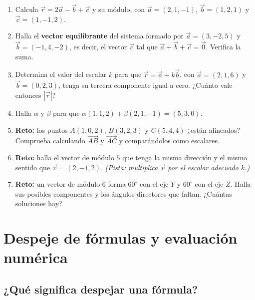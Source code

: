 \documentclass[12pt, letterpaper]{article}
\begin{document}
\begin{enumerate}[leftmargin=*, resume]
  \item \dificil{} Calcula $\vec{r} = 2\vec{a} - \vec{b} + \vec{c}$ y su módulo, con $\vec{a} = (2, 1, -1)$, $\vec{b} = (1, 2, 1)$ y $\vec{c} = (1, -1, 2)$.

  \item \dificil{} Halla el \textbf{vector equilibrante} del sistema formado por $\vec{a} = (3, -2, 5)$ y $\vec{b} = (-1, 4, -2)$, es decir, el vector $\vec{c}$ tal que $\vec{a} + \vec{b} + \vec{c} = \vec{0}$. Verifica la suma.

  \item \dificil{} Determina el valor del escalar $k$ para que $\vec{r} = \vec{a} + k\vec{b}$, con $\vec{a} = (2, 1, 6)$ y $\vec{b} = (0, 2, 3)$, tenga su tercera componente igual a cero. ¿Cuánto vale entonces $|\vec{r}|$?

  \item \dificil{} Halla $\alpha$ y $\beta$ para que $\alpha(1, 1, 2) + \beta(2, 1, -1) = (5, 3, 0)$.

  \item \muyDificil{} \textbf{Reto:} los puntos $A(1, 0, 2)$, $B(3, 2, 3)$ y $C(5, 4, 4)$ ¿están alineados? Comprueba calculando $\overrightarrow{AB}$ y $\overrightarrow{AC}$ y comparándolos como escalares.

  \item \muyDificil{} \textbf{Reto:} halla el vector de módulo $5$ que tenga la misma dirección y el mismo sentido que $\vec{v} = (2, -1, 2)$. \emph{(Pista: multiplica $\vec{v}$ por el escalar adecuado $k$.)}

  \item \muyDificil{} \textbf{Reto:} un vector de módulo $6$ forma $60^{\circ}$ con el eje $Y$ y $60^{\circ}$ con el eje $Z$. Halla sus posibles componentes y los ángulos directores que faltan. ¿Cuántas soluciones hay?
\end{enumerate}

\newpage

\section{Despeje de fórmulas y evaluación numérica}

\subsection{¿Qué significa despejar una fórmula?}
\end{document}

